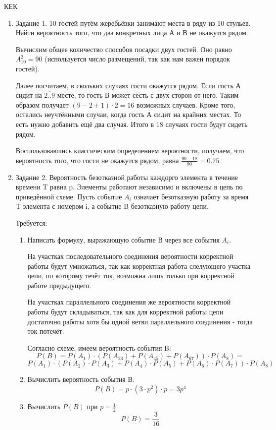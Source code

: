 

КЕК
\begin{enumerate}
\item{Задание 1.}
10 гостей путём жеребьёвки занимают места в ряду из 10 стульев. Найти вероятность того, что два конкретных лица А и В не окажутся рядом.

Вычислим общее количество способов посадки двух гостей. Оно равно $ A_{10}^2 = 90 $ (используется число размещений, так как нам важен порядок
гостей).

Далее посчитаем, в скольких случаях гости окажутся рядом. Если гость А сидит на $\overline{2..9}$ месте, то гость В может сесть с двух сторон от него. Таким образом получает $(9 - 2 + 1) \cdot 2 = 16$ возможных случаев. Кроме того, остались неучтёнными случаи, когда гость А сидит на крайних местах. То есть нужно добавить ещё два случая. Итого в 18 случаях гости будут сидеть рядом.

Воспользовавшись классическим определением вероятности, получаем, что вероятность того, что гости не окажутся рядом, равна $\frac{90-18}{90}=0.75$

\item{Задание 2}. Вероятность безотказной работы каждорго элемента в течение времени T равна p. Элементы работают независимо и включены в цепь по приведённой схеме. Пусть событие $A_i$ означает безотказную работу за время T элемента с номером i, а событие B безотказную работу цепи.

Требуется:
\begin{enumerate}
\item{} Написать формулу, выражающую событие В через все события $A_i$.

На участках последовательного соединения вероятности корректной работы будут умножаться, так как корректная работа слелующего участка цепи, по которому течёт ток, возможна лишь только при корректной работе предыдущего.

На участках параллельного соединения же вероятности корректной работы будут складываться, так как для корректной работы цепи достаточно работы хотя бы одной ветви параллельного соединения - тогда ток потечёт.

Согласно схеме, имеем вероятность события B:
$$P(B) = P(A_1) \cdot (P(A_{23}) + P(A_{45}) + P(A_{67})) \cdot P(A_8) = $$
$$P(A_1) \cdot (P(A_2) \cdot P(A_3) + P(A_4) \cdot P(A_5) + P(A_6) \cdot P(A_7)) \cdot P(A_8)$$

\item{} Вычислить вероятность события В.
$$P(B) = p \cdot (3\cdot p^2) \cdot p = 3p^4$$
\item{} Вычислить $P(B)$ при $p=\frac{1}{2}$
$$P(B) = \frac{3}{16}$$
\end{enumerate}


\end{enumerate}
